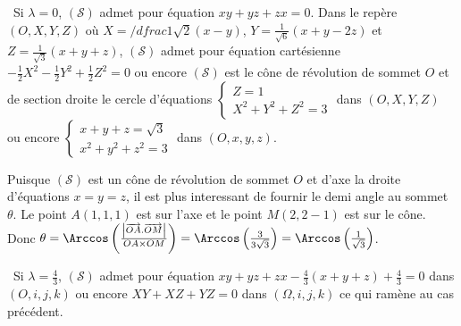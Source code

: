 {{\textbullet~Si $\lambda=0$, $(\mathcal{S})$ admet pour équation $xy+yz+zx = 0$.
Dans le repère $(O,X,Y,Z)$ où $X=/dfrac{1}{\sqrt{2}}(x-y)$, $Y = \frac{1}{\sqrt{6}}(x+y-2z)$ et $Z = \frac{1}{\sqrt{3}}(x+y+z)$, $(\mathcal{S})$ admet pour équation cartésienne $- \frac{1}{2}X^2-  \frac{1}{2}Y^2+ \frac{1}{2}Z^2 = 0$ ou encore $(\mathcal{S})$ est le cône de révolution de sommet 
$O$ et de section droite le cercle d'équations $\left\{
\begin{array}{l}
Z=1\\
X^2+Y^2+Z^2=3
\end{array}
\right.$ dans $(O,X,Y,Z)$ ou encore $\left\{
\begin{array}{l}
x+y+z=\sqrt{3}\\
x^2+y^2+z^2=3
\end{array}
\right.$ dans $(O,x,y,z)$.

Puisque $(\mathcal{S})$ est un cône de révolution de sommet $O$ et d'axe la droite d'équations $x=y=z$, il est plus interessant de fournir le demi angle au sommet $\theta$. Le point $A(1,1,1)$ est sur l'axe et le point $M(2,2-1)$ est sur le cône. Donc $\theta=\Arccos\left( \frac{\left|\overrightarrow{OA}.\overrightarrow{OM}\right|}{OA\times OM}\right)=\Arccos\left( \frac{3}{3\sqrt{3}}\right)=\Arccos\left( \frac{1}{\sqrt{3}}\right)$. 

\textbullet~Si $\lambda= \frac{4}{3}$, $(\mathcal{S})$ admet pour équation $xy+yz+zx- \frac{4}{3}(x+y+z) + \frac{4}{3}= 0$ dans $(O,i,j,k)$  ou encore 
$XY+XZ+YZ = 0$ dans $(\Omega,i,j,k)$ ce qui ramène au cas précédent.
}
}
